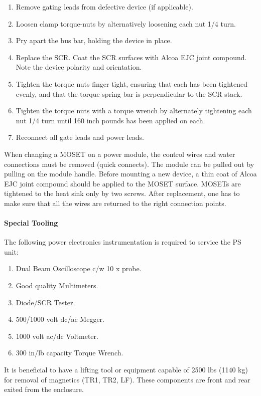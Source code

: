 \begin{enumerate}
\item Remove gating leads from defective device (if applicable).
\item Loosen clamp torque-nuts by alternatively loosening each nut
1/4 turn.
\item Pry apart the bus bar, holding the device in place.
\item Replace the SCR.  Coat the SCR surfaces with Alcoa EJC joint
compound. Note the device polarity and orientation.
\item Tighten the torque nuts finger tight, ensuring that each has
been tightened evenly, and that the torque spring bar is perpendicular
to the SCR stack.
\item Tighten the torque nuts with a torque wrench by alternately
tightening each nut 1/4 turn until 160 inch pounds has been applied on
each.
\item Reconnect all gate leads and power leads.
\end{enumerate}

When changing a MOSET on a power module, the control wires and
water connections must be removed (quick connects).  The module can be
pulled out by pulling on the module handle.  Before mounting a new
device, a thin coat of Alcoa EJC joint compound should be applied to the
MOSET surface.  MOSETs are tightened to the heat sink only by two
screws.  After replacement, one has to make sure that all the wires are
returned to the right connection points.


\paragraph{Special Tooling}

The following power electronics instrumentation is required to
service the PS unit:

\begin{enumerate}
\item Dual Beam Oscilloscope c/w 10 x probe.
\item Good quality Multimeters.
\item Diode/SCR Tester.
\item 500/1000 volt dc/ac Megger.
\item 1000 volt ac/dc Voltmeter.
\item 300 in/lb capacity Torque Wrench.
\end{enumerate}

It is beneficial to have a lifting tool or equipment capable of
2500 lbs (1140 kg) for removal of magnetics (TR1, TR2, LF). These
components are front and rear exited from the enclosure.



